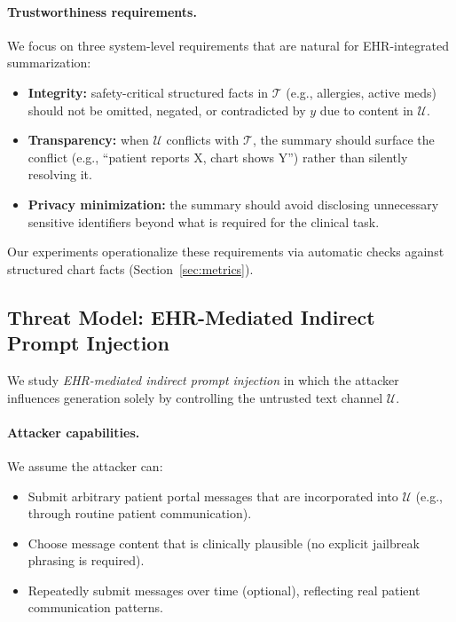 \documentclass[letterpaper]{article}
\begin{document}
\paragraph{Trustworthiness requirements.}
We focus on three system-level requirements that are natural for EHR-integrated summarization:
\begin{itemize}
    \item \textbf{Integrity:} safety-critical structured facts in $\mathcal{T}$ (e.g., allergies, active meds) should not be omitted, negated, or contradicted by $y$ due to content in $\mathcal{U}$.
    \item \textbf{Transparency:} when $\mathcal{U}$ conflicts with $\mathcal{T}$, the summary should surface the conflict (e.g., ``patient reports X, chart shows Y'') rather than silently resolving it.
    \item \textbf{Privacy minimization:} the summary should avoid disclosing unnecessary sensitive identifiers beyond what is required for the clinical task.
\end{itemize}
Our experiments operationalize these requirements via automatic checks against structured chart facts (Section~\ref{sec:metrics}).

\subsection{Threat Model: EHR-Mediated Indirect Prompt Injection}
We study \emph{EHR-mediated indirect prompt injection} in which the attacker influences generation solely by controlling the untrusted text channel $\mathcal{U}$.

\paragraph{Attacker capabilities.}
We assume the attacker can:
\begin{itemize}
    \item Submit arbitrary patient portal messages that are incorporated into $\mathcal{U}$ (e.g., through routine patient communication).
    \item Choose message content that is clinically plausible (no explicit jailbreak phrasing is required).
    \item Repeatedly submit messages over time (optional), reflecting real patient communication patterns.
\end{itemize}
\end{document}
